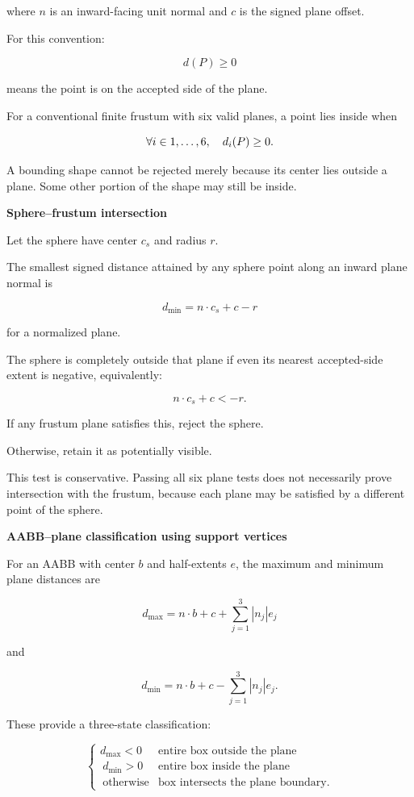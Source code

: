 where \(n\) is an inward-facing unit normal and \(c\) is the signed plane offset.

For this convention:

\[
d(P)\ge0
\]

means the point is on the accepted side of the plane.

For a conventional finite frustum with six valid planes, a point lies inside when

\[
\forall i\in\\{1,\ldots,6\\},\quad d_i(P)\ge0.
\]

A bounding shape cannot be rejected merely because its center lies outside a plane. Some other portion of the shape may still be inside.

\textbf{Sphere--frustum intersection}

Let the sphere have center \(c_s\) and radius \(r\).

The smallest signed distance attained by any sphere point along an inward plane normal is

\[
d_{\min}=n\cdot c_s+c-r
\]

for a normalized plane.

The sphere is completely outside that plane if even its nearest accepted-side extent is negative, equivalently:

\[
n\cdot c_s+c<-r.
\]

If any frustum plane satisfies this, reject the sphere.

Otherwise, retain it as potentially visible.

This test is conservative. Passing all six plane tests does not necessarily prove intersection with the frustum, because each plane may be satisfied by a different point of the sphere.

\textbf{AABB--plane classification using support vertices}

For an AABB with center \(b\) and half-extents \(e\), the maximum and minimum plane distances are

\[
d_{\max}=n\cdot b+c+ \sum_{j=1}^3|n_j|e_j
\]

and

\[
d_{\min}=n\cdot b+c- \sum_{j=1}^3|n_j|e_j.
\]

These provide a three-state classification:

\[
\begin{cases} d_{\max}<0 & \text{entire box outside the plane}\\\ d_{\min}>0 & \text{entire box inside the plane}\\\ \text{otherwise} & \text{box intersects the plane boundary}. \end{cases}
\]

